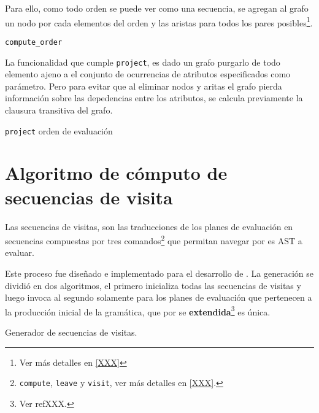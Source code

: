 Para ello, como todo orden se puede ver como una secuencia, se agregan al grafo un nodo por cada elementos del orden y las aristas para todos los pares posibles\footnote{Ver más detalles en \ref{XXX}}.

\begin{algorithm}[H]

\caption{\texttt{compute\_order}}
\end{algorithm}

La funcionalidad que cumple \texttt{project}, es dado un grafo purgarlo de todo elemento ajeno a el conjunto de ocurrencias de atributos especificados como parámetro. Pero para evitar que al eliminar nodos y aritas el grafo pierda información sobre las depedencias entre los atributos, se calcula previamente la clausura transitiva del grafo.

\begin{algorithm}[H]

\caption{\texttt{project} orden de evaluación}
\end{algorithm}

\section{Algoritmo de cómputo de secuencias de visita}

Las secuencias de visitas, son las traducciones de los planes de evaluación en secuencias compuestas por tres comandos\footnote{\texttt{compute}, \texttt{leave} y \texttt{visit}, ver más detalles en \ref{XXX}.} que permitan navegar por es AST a evaluar.

Este proceso fue diseñado e implementado para el desarrollo de \maggen. La generación se dividió en dos algoritmos, el primero inicializa todas las secuencias de visitas y luego invoca al segundo solamente para los planes de evaluación que pertenecen a la producción inicial de la gramática, que por se \textbf{extendida}\footnote{Ver ref{XXX}.} es única.

\begin{algorithm}[H]

\caption{Generador de secuencias de visitas.}
\end{algorithm}

